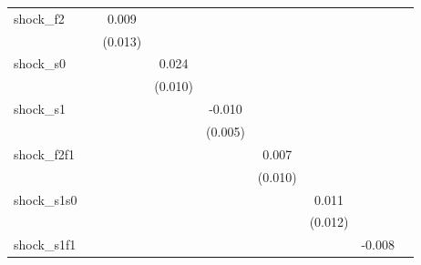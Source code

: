 {\begin{tabular}{l*{8}{c}}
\addlinespace
shock\_f2    &                     &       0.009         &                     &                     &                     &                     &                     &                     \\
            &                     &     (0.013)         &                     &                     &                     &                     &                     &                     \\
\addlinespace
shock\_s0    &                     &                     &       0.024\sym{**} &                     &                     &                     &                     &                     \\
            &                     &                     &     (0.010)         &                     &                     &                     &                     &                     \\
\addlinespace
shock\_s1    &                     &                     &                     &      -0.010\sym{*}  &                     &                     &                     &                     \\
            &                     &                     &                     &     (0.005)         &                     &                     &                     &                     \\
\addlinespace
shock\_f2f1  &                     &                     &                     &                     &       0.007         &                     &                     &                     \\
            &                     &                     &                     &                     &     (0.010)         &                     &                     &                     \\
\addlinespace
shock\_s1s0  &                     &                     &                     &                     &                     &       0.011         &                     &                     \\
            &                     &                     &                     &                     &                     &     (0.012)         &                     &                     \\
\addlinespace
shock\_s1f1  &                     &                     &                     &                     &                     &                     &      -0.008         &                     \\

\end{tabular}}

